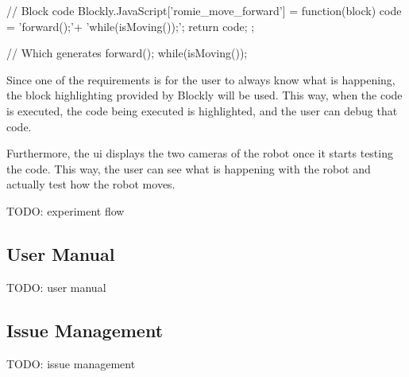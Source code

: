 \begin{center}
\begin{minipage}{.9\textwidth}
\singlespace
{}
\begin{pyglist}[language=javascript, caption={Generated code.},
	label={alg:generated}, listingname={Algorithm}, numbers=left]
// Block code
Blockly.JavaScript['romie_move_forward'] = function(block) {
    code = 'forward();\n'+
            'while(isMoving());\n';
    return code;
};

// Which generates
forward();
while(isMoving());
\end{pyglist}
\end{minipage}
\end{center}

Since one of the requirements is for the user to always know what is happening, the block
highlighting provided by Blockly will be used. This way, when the code is executed, the code being
executed is highlighted, and the user can debug that code.

Furthermore, the \acrlong{ui} displays the two cameras of the robot once it starts testing the code.
This way, the user can see what is happening with the robot and actually test how the robot moves.

TODO: experiment flow

\subsection{User Manual}

TODO: user manual

\subsection{Issue Management}

TODO: issue management
